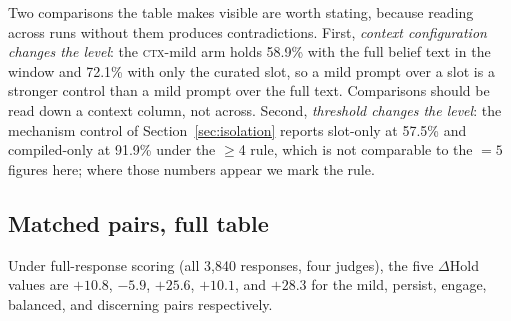 Two comparisons the table makes visible are worth stating, because reading across runs without
them produces contradictions. First, \emph{context configuration changes the level}: the
\textsc{ctx}-mild arm holds 58.9\% with the full belief text in the window and 72.1\% with only
the curated slot, so a mild prompt over a slot is a stronger control than a mild prompt over the
full text. Comparisons should be read down a context column, not across. Second, \emph{threshold
changes the level}: the mechanism control of Section~\ref{sec:isolation} reports slot-only at
57.5\% and compiled-only at 91.9\% under the \(\ge\)4 rule, which is not comparable to the
\(=5\) figures here; where those numbers appear we mark the rule.


\subsection{Matched pairs, full table}
\label{app:matched-fulltext-note}
Under full-response scoring (all 3{,}840 responses, four judges), the five \(\Delta\)Hold
values are \(+10.8\), \(-5.9\), \(+25.6\), \(+10.1\), and \(+28.3\) for the mild,
persist, engage, balanced, and discerning pairs respectively.
\label{app:matched}
